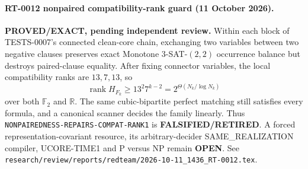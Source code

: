 \paragraph{RT-0012 nonpaired compatibility-rank guard (11 October 2026).}
\textbf{PROVED/EXACT, pending independent review.}
Within each block of TESTS-0007's connected clean-core chain, exchanging two
variables between two negative clauses preserves exact Monotone
$3$-SAT-$(2,2)$ occurrence balance but destroys paired-clause equality.
After fixing connector variables, the local compatibility ranks are
$13,7,13$, so
\[
 \operatorname{rank}H_{F_k}\ge 13^2 7^{k-2}
 =2^{\Theta(N_k/\log N_k)}
\]
over both $\mathbb F_2$ and $\mathbb R$.  The same cubic-bipartite perfect
matching still satisfies every formula, and a canonical scanner decides the
family linearly.  Thus \texttt{NONPAIREDNESS-REPAIRS-COMPAT-RANK1} is
\textbf{FALSIFIED/RETIRED}.  A forced representation-covariant resource, its
arbitrary-decider SAME\_REALIZATION compiler, UCORE-TIME1 and P versus NP
remain \textbf{OPEN}.  See
\texttt{research/review/reports/redteam/2026-10-11\_1436\_RT-0012.tex}.
